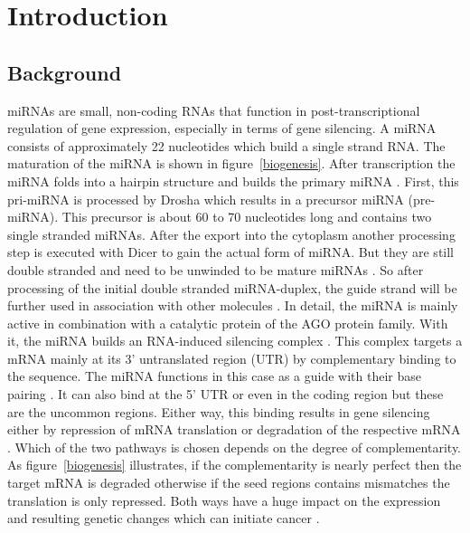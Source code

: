 \documentclass[12pt]{article}
\begin{document}
\tableofcontents

\newpage 
{}






 
\section{Introduction}
\subsection{Background}

miRNAs are small, non-coding RNAs that function in post-transcriptional regulation of gene expression, especially in terms of gene silencing. A miRNA consists of approximately 22 nucleotides which build a single strand RNA. The maturation of the miRNA is shown in figure~\ref{biogenesis}. After transcription the miRNA folds into a hairpin structure and builds the primary miRNA \cite{Macfarlane}. First, this pri-miRNA is processed by Drosha which results in a precursor miRNA (pre-miRNA). This precursor is about 60 to 70 nucleotides long and contains two single stranded miRNAs. After the export into the cytoplasm another processing step is executed with Dicer to gain the actual form of miRNA. But they are still double stranded and need to be unwinded to be mature miRNAs \cite{Macfarlane}. So after processing of the initial double stranded miRNA-duplex, the guide strand will be further used in association with other molecules \cite{Grunz}. In detail, the miRNA is mainly active in combination with a catalytic protein of the AGO protein family. With it, the miRNA builds an RNA-induced silencing complex \cite{Ha}. This complex targets a mRNA mainly at its 3' untranslated region (UTR) by complementary binding to the sequence. The miRNA functions in this case as a guide with their base pairing \cite{Macfarlane}. It can also bind at the 5' UTR or even in the coding region but these are the uncommon regions. Either way, this binding results in gene silencing either by repression of mRNA translation or degradation of the respective mRNA \cite{Enright}. Which of the two pathways is chosen depends on the degree of complementarity. As figure~\ref{biogenesis} illustrates, if the complementarity is nearly perfect then the target mRNA is degraded otherwise if the seed regions contains mismatches the translation is only repressed. Both ways have a huge impact on the expression and resulting genetic changes which can initiate cancer \cite{Macfarlane}.
\end{document}
